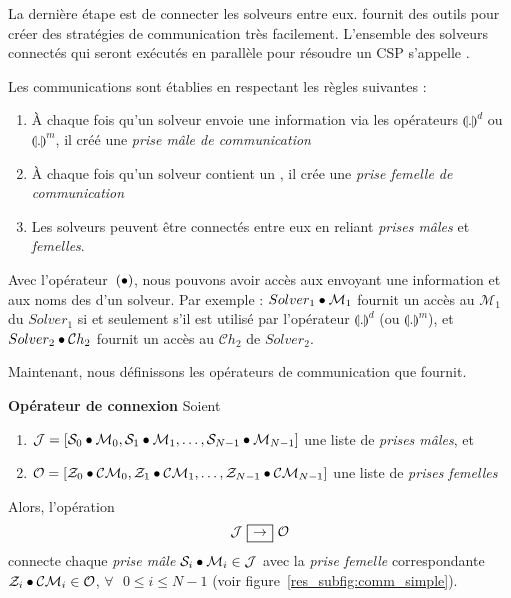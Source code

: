La dernière étape est de connecter les solveurs entre eux. \posl{} fournit des outils pour créer des stratégies de communication très facilement. L'ensemble des solveurs connectés qui seront exécutés en parallèle pour résoudre un CSP s'appelle \infr{\soset{}}.

Les communications sont établies en respectant les règles suivantes :
\begin{enumerate}
\item  À chaque  fois qu'un  solveur  envoie une information via les opérateurs  $\llparenthesis .\rrparenthesis^{d}$  ou $\llparenthesis   .\rrparenthesis^{m}$, il créé une {\it prise mâle de communication} 
\item À chaque fois qu'un  solveur contient un \infr{\opch{}}, il  crée une {\it prise femelle de communication} 
\item Les solveurs peuvent être connectés entre eux en reliant {\it prises mâles} et {\it femelles}.
\end{enumerate}

Avec l'opérateur~$(\bullet)$, nous  pouvons avoir accès aux \infr{\oms{}} envoyant une information et aux noms des \infr{\opchs{}} d'un solveur. Par exemple : $Solver_1\bullet\mathcal{M}_1$ fournit un accès au \infr{\om{}} $\mathcal{M}_1$ du $Solver_1$ si et seulement s'il est utilisé par l'opérateur  $\llparenthesis .\rrparenthesis^{d}$  (ou $\llparenthesis.\rrparenthesis^{m}$), et $Solver_2\bullet\mathcal{C}h_2$ fournit un accès au \infr{\opch{}} $\mathcal{C}h_2$ de $Solver_2$.

Maintenant, nous définissons les opérateurs de communication que \posl{} fournit.

\begin{lemma}\label{res_op_conn:1to1}
{\bf Opérateur de connexion \infr{\oneTone}} Soient
\begin{enumerate}
\item $\mathcal{J} = \left[\mathcal{S}_0\bullet \mathcal{M}_0, \mathcal{S}_1\bullet \mathcal{M}_1,\dots, \mathcal{S}_{N-1}\bullet \mathcal{M}_{N-1}\right]$ une liste de  {\it prises mâles}, et
\item $\mathcal{O} = \left[\mathcal{Z}_0\bullet \mathcal{CM}_0, \mathcal{Z}_1\bullet \mathcal{CM}_1,\dots, \mathcal{Z}_{N-1}\bullet \mathcal{CM}_{N-1}\right]$ une liste de {\it prises femelles}
\end{enumerate} Alors, l'opération
\[
\mathcal{J} \onetoonesep \mathcal{O}
\]
connecte chaque {\it prise mâle} $\mathcal{S}_i\bullet \mathcal{M}_i \in \mathcal{J}$ avec la {\it prise femelle} correspondante $\mathcal{Z}_i\bullet \mathcal{CM}_i \in \mathcal{O}$, $\forall\textbf{ }0 \leq i \leq N-1$ (voir figure~\ref{res_subfig:comm_simple}).
\end{lemma}

